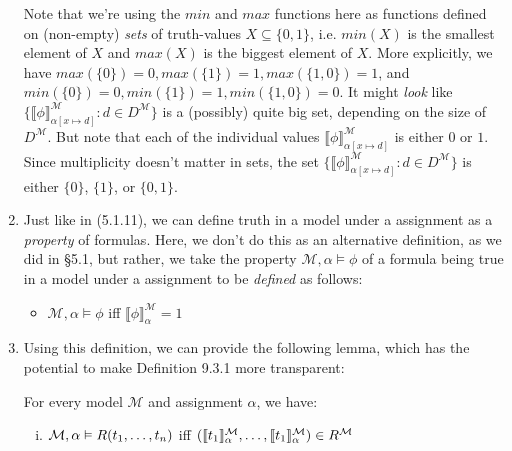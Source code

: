 \begin{enumerate}[\thesection.1]
\begin{enumerate}[(i)]
\begin{enumerate}[(a)]
				\end{enumerate}
			
			\end{enumerate}
			
			Note that we're using the $min$ and $max$ functions here as functions defined on (non-empty) \emph{sets} of truth-values $X\subseteq\{0,1\}$, i.e. $min(X)$ is the smallest element of $X$ and $max(X)$ is the biggest element of $X$. More explicitly, we have $max(\{0\})=0, max(\{1\})=1, max(\{1,0\})=1$, and $min(\{0\})=0, min(\{1\})=1, min(\{1,0\})=0$. It might \emph{look} like $\{\llbracket \phi\rrbracket^\mathcal{M}_{\alpha[x\mapsto d]}: d\in D^\mathcal{M}\}$ is a (possibly) quite big set, depending on the size of $D^\mathcal{M}$. But note that each of the individual values $\llbracket \phi\rrbracket^\mathcal{M}_{\alpha[x\mapsto d]}$ is either $0$ or $1$. Since multiplicity doesn't matter in sets, the set $\{\llbracket \phi\rrbracket^\mathcal{M}_{\alpha[x\mapsto d]}: d\in D^\mathcal{M}\}$ is either $\{0\}$, $\{1\}$, or $\{0,1\}$.
		
			
			\item Just like in (5.1.11), we can define truth in a model under a assignment as a \emph{property} of formulas. Here, we don't do this as an alternative definition, as we did in \S5.1, but rather, we take the property $\mathcal{M},\alpha\vDash\phi$ of a formula being true in a model under a assignment to be \emph{defined} as follows:
			
			\begin{itemize}
			
				\item $\mathcal{M},\alpha\vDash\phi$ iff $\llbracket\phi\rrbracket^\mathcal{M}_\alpha=1$
			
			\end{itemize}
			
		\item Using this definition, we can provide the following lemma, which has the potential to make Definition 9.3.1 more transparent:
			
			\begin{lemma} For every model $\mathcal{M}$ and assignment $\alpha$, we have:
			
			\begin{enumerate}[(i)]
			
				\item $\mathcal{M},\alpha\vDash R(t_1,\mathellipsis, t_n)$ iff $(\llbracket t_1\rrbracket^\mathcal{M}_\alpha,\mathellipsis, \llbracket t_1\rrbracket^\mathcal{M}_\alpha)\in R^\mathcal{M}$
				

\end{enumerate}
\end{lemma}
\end{enumerate}
